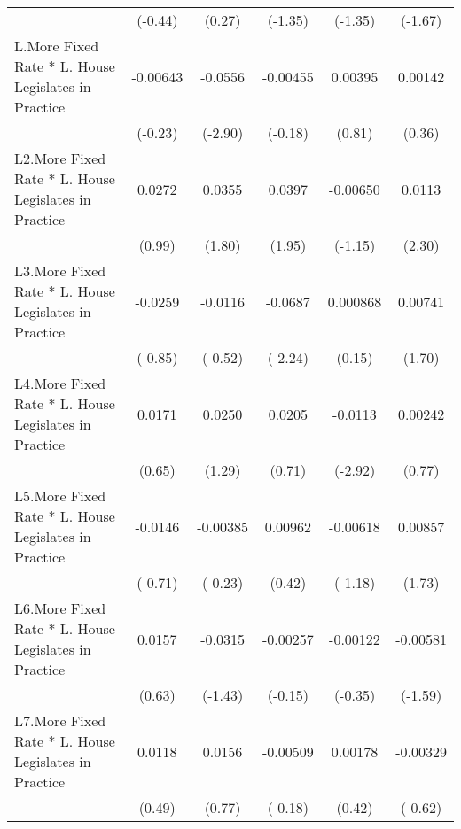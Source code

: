 {\begin{longtable}{l*{5}{c}}
                &  (-0.44)         &   (0.27)         &  (-1.35)         &  (-1.35)         &  (-1.67)         \\
[1em]
L.More Fixed Rate * L. House Legislates in Practice& -0.00643         &  -0.0556\sym{**} & -0.00455         &  0.00395         &  0.00142         \\
                &  (-0.23)         &  (-2.90)         &  (-0.18)         &   (0.81)         &   (0.36)         \\
[1em]
L2.More Fixed Rate * L. House Legislates in Practice&   0.0272         &   0.0355         &   0.0397         & -0.00650         &   0.0113\sym{*}  \\
                &   (0.99)         &   (1.80)         &   (1.95)         &  (-1.15)         &   (2.30)         \\
[1em]
L3.More Fixed Rate * L. House Legislates in Practice&  -0.0259         &  -0.0116         &  -0.0687\sym{*}  & 0.000868         &  0.00741         \\
                &  (-0.85)         &  (-0.52)         &  (-2.24)         &   (0.15)         &   (1.70)         \\
[1em]
L4.More Fixed Rate * L. House Legislates in Practice&   0.0171         &   0.0250         &   0.0205         &  -0.0113\sym{**} &  0.00242         \\
                &   (0.65)         &   (1.29)         &   (0.71)         &  (-2.92)         &   (0.77)         \\
[1em]
L5.More Fixed Rate * L. House Legislates in Practice&  -0.0146         & -0.00385         &  0.00962         & -0.00618         &  0.00857         \\
                &  (-0.71)         &  (-0.23)         &   (0.42)         &  (-1.18)         &   (1.73)         \\
[1em]
L6.More Fixed Rate * L. House Legislates in Practice&   0.0157         &  -0.0315         & -0.00257         & -0.00122         & -0.00581         \\
                &   (0.63)         &  (-1.43)         &  (-0.15)         &  (-0.35)         &  (-1.59)         \\
[1em]
L7.More Fixed Rate * L. House Legislates in Practice&   0.0118         &   0.0156         & -0.00509         &  0.00178         & -0.00329         \\
                &   (0.49)         &   (0.77)         &  (-0.18)         &   (0.42)         &  (-0.62)         \\

\end{longtable}}
